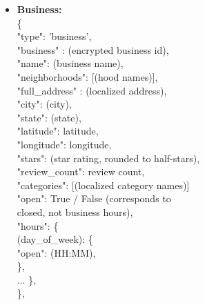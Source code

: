 \documentclass{article}
\newcommand\tab[1][1cm]{\hspace*{#1}}
\begin{document}
\begin{itemize}
\item \textbf{Business:}
\\ \{
\\ \tab   "type": 'business',
\\ \tab "business" : (encrypted business id),
\\ \tab "name": (business name),
\\ \tab "neighborhoods": [(hood names)],
\\ \tab "full\_address" : (localized address),
\\ \tab    "city": (city),
\\ \tab    "state": (state),
\\ \tab    "latitude": latitude,
\\ \tab    "longitude": longitude,
\\ \tab    "stars": (star rating, rounded to half-stars),
\\ \tab    "review\_count": review count,
\\ \tab    "categories": [(localized category names)]
\\ \tab    "open": True / False (corresponds to
\\ \tab      closed, not business hours),
\\ \tab    "hours": \{
\\ \tab        (day\_of\_week): \{
\\ \tab            "open": (HH:MM),
\\ \tab \},
\\ \tab... \},
\\ \},



\end{itemize}
\end{document}
